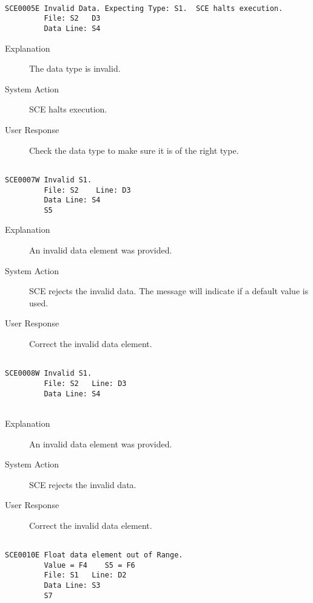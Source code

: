 \hrulefill
\begin{verbatim}

SCE0005E Invalid Data. Expecting Type: S1.  SCE halts execution.
         File: S2   D3
         Data Line: S4
\end{verbatim}
\begin{description}
\item[Explanation]  The data type is invalid.

\item[System Action]  SCE halts execution.

\item[User Response]  Check the data type to make sure it is of the right type.
\end{description}
\hrulefill
\begin{verbatim}

SCE0007W Invalid S1.
         File: S2    Line: D3
         Data Line: S4
         S5
\end{verbatim}
\begin{description}
\item[Explanation]  An invalid data element was provided.

\item[System Action]  SCE rejects the invalid data.
 The message will indicate if a default value is used. 

\item[User Response]  Correct the invalid data element.
\end{description}
\hrulefill
\begin{verbatim}

SCE0008W Invalid S1.
         File: S2   Line: D3
         Data Line: S4
         
\end{verbatim}
\begin{description}
\item[Explanation]  An invalid data element was provided.

\item[System Action]  SCE rejects the invalid data.

\item[User Response]  Correct the invalid data element.
\end{description}
\hrulefill
\begin{verbatim}

SCE0010E Float data element out of Range.
         Value = F4    S5 = F6
         File: S1   Line: D2
         Data Line: S3
         S7
\end{verbatim}
